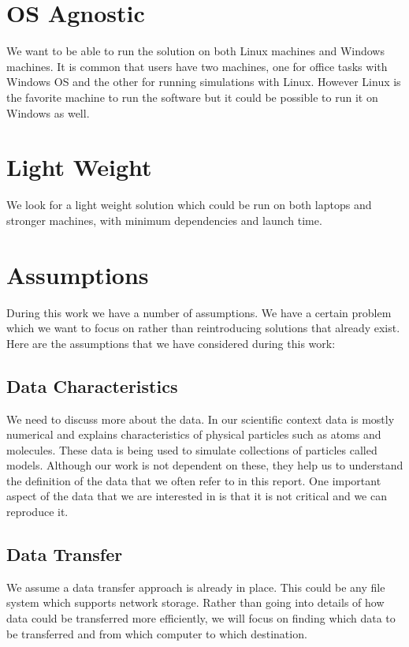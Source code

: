 \section{OS Agnostic}
We want to be able to run the solution on both Linux machines and Windows machines. It is common that users have
two machines, one for office tasks with Windows OS and the other for running simulations with Linux. However Linux
is the favorite machine to run the software but it could be possible to run it on Windows as well.

\section{Light Weight}
We look for a light weight solution which could be run on both laptops and stronger machines, with minimum dependencies
and launch time.


\section{Assumptions}
During this work we have a number of assumptions. We have a certain problem which we want to focus
on rather than reintroducing solutions that already exist. Here are the assumptions that we have
considered during this work:


\subsection{Data Characteristics}
We need to discuss more about the data. In our scientific context data is mostly numerical and explains characteristics
of physical particles such as atoms and molecules. These data is being used to simulate collections of particles called
models. Although our work is not dependent on these, they help us to understand the definition of the data that
we often refer to in this report. One important aspect of the data that we are interested in is that it is not critical 
and we can reproduce it. 

\subsection{Data Transfer}
We assume a data transfer approach is already in place. This could be any file system which supports 
network storage. Rather than going into details of how data could be transferred more efficiently, we will
focus on finding which data to be transferred and from which computer to which destination.

